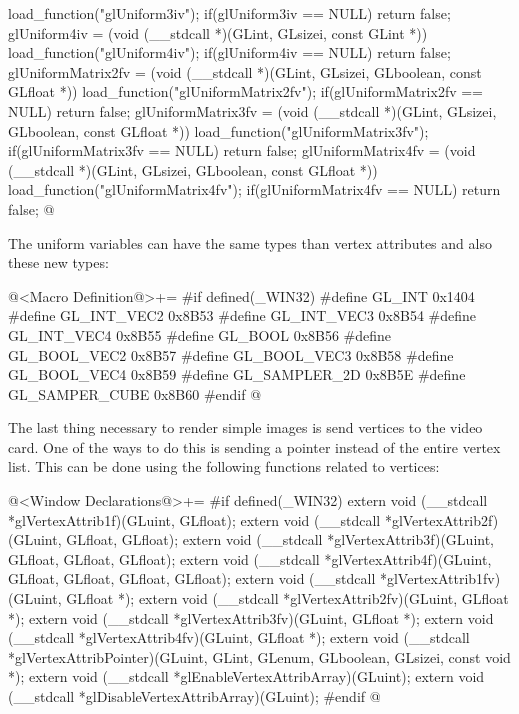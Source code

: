                  load_function("glUniform3iv");
if(glUniform3iv == NULL) return false;
glUniform4iv = (void (__stdcall *)(GLint, GLsizei, const GLint *))
                 load_function("glUniform4iv");
if(glUniform4iv == NULL) return false;
glUniformMatrix2fv = (void (__stdcall *)(GLint, GLsizei, GLboolean,
                                         const GLfloat *))
                      load_function("glUniformMatrix2fv");
if(glUniformMatrix2fv == NULL) return false;
glUniformMatrix3fv = (void (__stdcall *)(GLint, GLsizei, GLboolean,
                                         const GLfloat *))
                      load_function("glUniformMatrix3fv");
if(glUniformMatrix3fv == NULL) return false;
glUniformMatrix4fv = (void (__stdcall *)(GLint, GLsizei, GLboolean,
                                         const GLfloat *))
                      load_function("glUniformMatrix4fv");
if(glUniformMatrix4fv == NULL) return false;
@
\fimcodigo

The uniform variables can have the same types than vertex attributes
and also these new types:

\iniciocodigo
@<Macro Definition@>+=
#if defined(_WIN32)
#define GL_INT         0x1404
#define GL_INT_VEC2    0x8B53
#define GL_INT_VEC3    0x8B54
#define GL_INT_VEC4    0x8B55
#define GL_BOOL        0x8B56
#define GL_BOOL_VEC2   0x8B57
#define GL_BOOL_VEC3   0x8B58
#define GL_BOOL_VEC4   0x8B59
#define GL_SAMPLER_2D  0x8B5E
#define GL_SAMPER_CUBE 0x8B60
#endif
@
\fimcodigo

The last thing necessary to render simple images is send vertices to
the video card. One of the ways to do this is sending a pointer
instead of the entire vertex list. This can be done using the
following functions related to vertices:

\iniciocodigo
@<Window Declarations@>+=
#if defined(_WIN32)
extern void (__stdcall *glVertexAttrib1f)(GLuint, GLfloat);
extern void (__stdcall *glVertexAttrib2f)(GLuint, GLfloat, GLfloat);
extern void (__stdcall *glVertexAttrib3f)(GLuint, GLfloat, GLfloat, GLfloat);
extern void (__stdcall *glVertexAttrib4f)(GLuint, GLfloat, GLfloat, GLfloat,
                                          GLfloat);
extern void (__stdcall *glVertexAttrib1fv)(GLuint, GLfloat *);
extern void (__stdcall *glVertexAttrib2fv)(GLuint, GLfloat *);
extern void (__stdcall *glVertexAttrib3fv)(GLuint, GLfloat *);
extern void (__stdcall *glVertexAttrib4fv)(GLuint, GLfloat *);
extern void (__stdcall *glVertexAttribPointer)(GLuint, GLint, GLenum, GLboolean,
                                               GLsizei, const void *);
extern void (__stdcall *glEnableVertexAttribArray)(GLuint);
extern void (__stdcall *glDisableVertexAttribArray)(GLuint);
#endif
@
\fimcodigo

